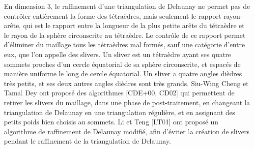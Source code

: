 {En dimension 3, le raffinement d'une triangulation de Delaunay ne permet pas de contrôler entièrement la forme des tétraèdres, mais seulement le rapport rayon-arête, qui est le rapport entre la longueur de la plus petite arête du tétraèdre et le rayon de la sphère circonscrite au tétraèdre. Le contrôle de ce rapport permet d'éliminer du maillage tous les tétraèdres mal formés, sauf une catégorie d'entre eux, que l'on appelle des slivers. Un sliver est un tétraèdre  ayant ses quatre sommets proches d'un cercle équatorial de sa sphère circonscrite, et espacés de manière uniforme le long de cercle équatorial. Un sliver a quatre angles dièdres très petits, et ses deux autres angles dièdres sont très grands. Siu-Wing Cheng et Tamal Dey ont proposé des algorithmes [CDE+00, CD02] qui permettent de retirer les slivers du maillage, dans une phase de post-traitement, en changeant la triangulation de Delaunay en une triangulation régulière, et en assignant des petits poids bien choisis au sommets. Li et Teng [LT01] ont proposé un algorithme de raffinement de Delaunay modifié, afin d'éviter la création de slivers pendant le raffinement de la triangulation de Delaunay.

}



